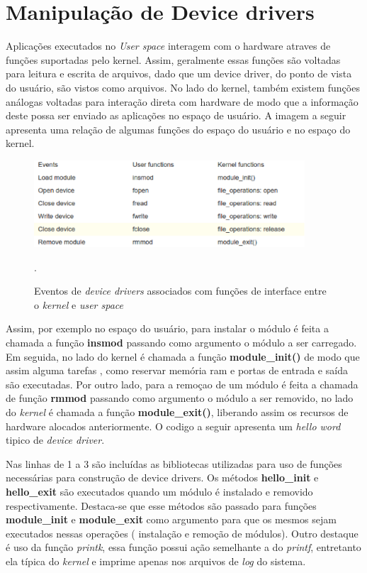 
\section{Manipulação de Device drivers}
Aplicações executados no \textit{User space} interagem com o hardware atraves de funções suportadas
pelo kernel. Assim, geralmente essas funções são voltadas para leitura e escrita de arquivos, dado que um
device driver, do ponto de vista do usuário, são vistos como arquivos. No lado do kernel, também
existem funções análogas voltadas para interação direta com hardware de modo que a informação deste
possa ser enviado as aplicações no espaço de usuário. A imagem a seguir apresenta uma relação de algumas
funções do espaço do usuário e no espaço do kernel.

\begin{figure}[H]
  \centering
  \includegraphics[width=0.9\textwidth]{figure/tabela.eps}
  \caption{ Eventos de \textit{device drivers} associados com funções de interface entre o \textit{kernel} e \textit{user space} }.
  \label{fig:usblinux}
\end{figure}

Assim, por exemplo no espaço do usuário, para instalar o módulo é feita a chamada a função \textbf{insmod} passando
como argumento o módulo a ser carregado. Em seguida, no lado do kernel é chamada a função \textbf{module\_init()} de
modo que assim alguma tarefas , como reservar memória ram e portas de entrada e saída são executadas.
Por outro lado, para a remoçao de um módulo é feita a chamada de função \textbf{rmmod} passando como argumento
o módulo a ser removido, no lado do \textit{kernel} é chamada a função \textbf{module\_exit()}, liberando assim os recursos
de hardware alocados anteriormente. O codigo a seguir apresenta um \textit{hello word} tipico de \textit{device driver}.

\lstset{style=shell}


Nas linhas de 1 a 3 são incluídas as bibliotecas utilizadas para uso de funções necessárias para 
construção de device drivers. Os métodos \textbf{hello\_init} e \textbf{hello\_exit} são executados quando um módulo 
é instalado e removido respectivamente. Destaca-se que esse métodos são passado para funções \textbf{ module\_init}
e \textbf{module\_exit} como argumento para que os mesmos sejam executados nessas operações ( instalação e 
remoção de módulos). Outro destaque é uso da função \textit{printk}, essa função possui ação semelhante a do \textit{printf}, 
entretanto ela típica do \textit{kernel} e imprime apenas nos arquivos de \textit{log} do sistema.


